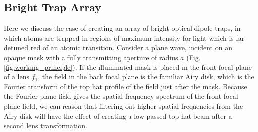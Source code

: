 \subsection{Bright Trap Array}
Here we discuss the case of creating an array of bright optical dipole traps, in which atoms are trapped in regions of maximum intensity for light which is far-detuned red of an atomic transition. Consider a plane wave, incident on an opaque mask with a fully transmitting aperture of radius $a$ (Fig. \ref{fig:working_principle}). If the illuminated mask is placed in the front focal plane of a lens $f_1$, the field in the back focal plane is the familiar Airy disk, which is the Fourier transform of the top hat profile of the field just after the mask. Because the Fourier plane field gives the spatial frequency spectrum of the front focal plane field, we can reason that filtering out higher spatial frequencies from the Airy disk will have the effect of creating a low-passed top hat beam after a second lens transformation.  
